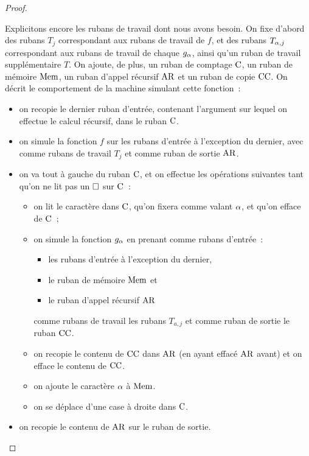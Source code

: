 \begin{proof}
\begin{itemize}
    Explicitons encore les rubans de travail dont nous avons besoin. On fixe
    d'abord des rubans $T_j$ correspondant aux rubans de travail de $f$, et
    des rubans $T_{\alpha,j}$ correspondant aux rubans de travail de chaque
    $g_{\alpha}$, ainsi qu'un ruban de travail supplémentaire $T$. On ajoute,
    de plus, un ruban de comptage $\mathrm{C}$, un ruban de mémoire $\mathrm{Mem}$, un
    ruban d'appel récursif $\mathrm{AR}$ et un ruban de copie $\mathrm{CC}$.
    On décrit le comportement de la machine simulant cette fonction~:
    \begin{itemize}
    \item on recopie le dernier ruban d'entrée, contenant l'argument sur lequel
      on effectue le calcul récursif, dans le ruban $\mathrm{C}$.
    \item on simule la fonction $f$ sur les rubans d'entrée à l'exception du
      dernier, avec comme rubans de travail $T_j$ et comme ruban de sortie
      $\mathrm{AR}$.
    \item on va tout à gauche du ruban $\mathrm{C}$, et on effectue les opérations
      suivantes tant qu'on ne lit pas un $\square$ sur $\mathrm{C}$~:
      \begin{itemize}
      \item on lit le caractère dans $\mathrm{C}$, qu'on fixera comme valant
        $\alpha$, et qu'on efface de $\mathrm{C}$~;
      \item on simule la fonction $g_{\alpha}$ en prenant comme rubans d'entrée~:
        \begin{itemize}
        \item les rubans d'entrée à l'exception du dernier,
        \item le ruban de mémoire $\mathrm{Mem}$ et
        \item le ruban d'appel récursif $\mathrm{AR}$
        \end{itemize}
        comme rubans de travail les rubans $T_{a,j}$ et comme ruban de sortie le
        ruban $\mathrm{CC}$.
      \item on recopie le contenu de $\mathrm{CC}$ dans $\mathrm{AR}$ (en ayant effacé $\mathrm{AR}$
        avant) et on efface le contenu de $\mathrm{CC}$.
      \item on ajoute le caractère $\alpha$ à $\mathrm{Mem}$.
      \item on se déplace d'une case à droite dans $\mathrm{C}$.
      \end{itemize}
    \item on recopie le contenu de $\mathrm{AR}$ sur le ruban de sortie.
    \end{itemize}
    

\end{itemize}
\end{proof}
